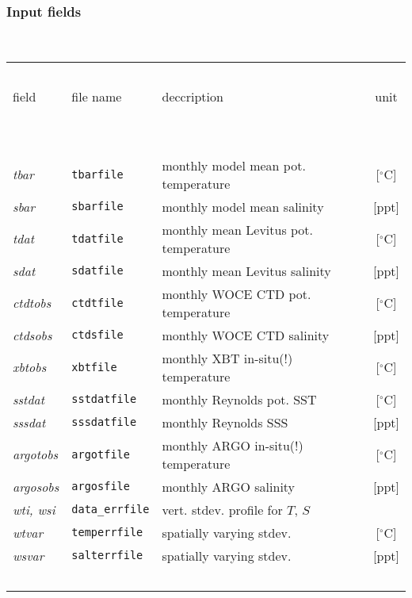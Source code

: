 \subsubsection{Input fields}
~

\begin{table}[h!]
\begin{center}
\begin{tabular}{lllc}
\hline \hline
~&~&~&~\\
field & file name & deccription & unit \\
~&~&~&~\\
\hline
~&~&~&~\\
{\it tbar} & {\tt tbarfile} & monthly model mean pot. temperature & 
[$^{\circ}\mathrm{C}$] \\
{\it sbar} & {\tt sbarfile} & monthly model mean salinity & 
[ppt] \\
{\it tdat} & {\tt tdatfile} & monthly mean Levitus pot. temperature & 
[$^{\circ}\mathrm{C}$] \\
{\it sdat} & {\tt sdatfile} & monthly mean Levitus salinity & 
[ppt] \\
{\it ctdtobs}  & {\tt ctdtfile} & monthly WOCE CTD pot. temperature & 
[$^{\circ}\mathrm{C}$] \\
{\it ctdsobs}  & {\tt ctdsfile} & monthly WOCE CTD salinity & 
[ppt] \\
{\it xbtobs} & {\tt xbtfile} & monthly XBT in-situ(!) temperature & 
[$^{\circ}\mathrm{C}$] \\
{\it sstdat}  & {\tt sstdatfile} & monthly Reynolds pot. SST & 
[$^{\circ}\mathrm{C}$] \\
{\it sssdat}  & {\tt sssdatfile} & monthly Reynolds SSS & 
[ppt] \\
{\it argotobs}  & {\tt argotfile} & monthly ARGO in-situ(!) temperature & 
[$^{\circ}\mathrm{C}$] \\
{\it argosobs}  & {\tt argosfile} & monthly ARGO salinity & 
[ppt] \\
{\it wti, wsi} & {\tt data\_errfile} & vert. stdev. profile for $T$, $S$ &
~ \\
{\it wtvar} & {\tt temperrfile} & spatially varying stdev. & [$^{\circ}\mathrm{C}$] \\
{\it wsvar} & {\tt salterrfile} & spatially varying stdev. & [ppt] \\
~&~&~&~\\
\hline \hline
\end{tabular}
\end{center}
\end{table}


